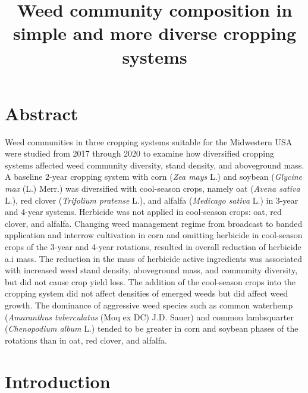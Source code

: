 \documentclass[
]{article}
\title{Weed community composition in simple and more diverse cropping systems}
\author{}
\date{\vspace{-2.5em}}
\begin{document}
\maketitle

\hypertarget{abstract}{%
\section*{Abstract}\label{abstract}}

Weed communities in three cropping systems suitable for the Midwestern USA were studied from 2017 through 2020 to examine how diversified cropping systems affected weed community diversity, stand density, and aboveground mass. A baseline 2-year cropping system with corn (\emph{Zea mays} L.) and soybean (\emph{Glycine max} (L.) Merr.) was diversified with cool-season crops, namely oat (\emph{Avena sativa} L.), red clover (\emph{Trifolium pratense} L.), and alfalfa (\emph{Medicago sativa} L.) in 3-year and 4-year systems. Herbicide was not applied in cool-season crops: oat, red clover, and alfalfa. Changing weed management regime from broadcast to banded application and interrow cultivation in corn and omitting herbicide in cool-season crops of the 3-year and 4-year rotations, resulted in overall reduction of herbicide a.i mass. The reduction in the mass of herbicide active ingredients was associated with increased weed stand density, aboveground mass, and community diversity, but did not cause crop yield loss. The addition of the cool-season crops into the cropping system did not affect densities of emerged weeds but did affect weed growth. The dominance of aggressive weed species such as common waterhemp (\emph{Amaranthus tuberculatus} (Moq ex DC) J.D. Sauer) and common lambsquarter (\emph{Chenopodium album} L.) tended to be greater in corn and soybean phases of the rotations than in oat, red clover, and alfalfa.

\hypertarget{introduction}{%
\section*{Introduction}\label{introduction}}
\end{document}
